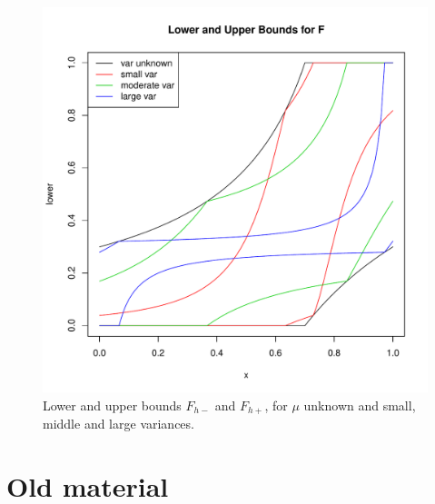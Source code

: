 \documentclass{article}
\newcommand{\Fmin}{F_{h-}}
\newcommand{\Fmax}{F_{h+}}
\begin{document}
\begin{figure}
\centering
\includegraphics[width=\linewidth]{bounds.pdf}
\caption{Lower and upper bounds $\Fmin$ and $\Fmax$, for $\mu$
unknown and small, middle and large variances.
\label{fig:bounds}
}
\end{figure}


%
%








\section{Old material}
\end{document}
